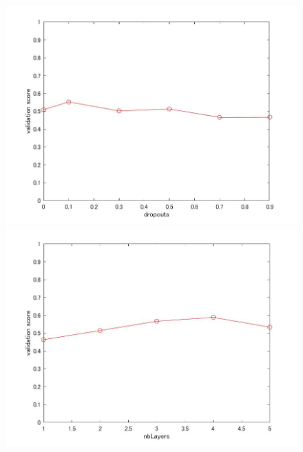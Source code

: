 \documentclass[a4j,11pt]{jarticle}
\begin{document}
\begin{figure}
\begin{minipage}{0.50\hsize}
\begin{center}
			\includegraphics[width=12cm, bb=0 0 875 656]{../matlab/fig/dropouts.jpg}
		\end{center}
	\end{minipage}
	\begin{minipage}{0.50\hsize}
		\begin{center}
			\includegraphics[width=12cm, bb=0 0 875 656]{../matlab/fig/nbLayers.jpg}
		\end{center}
	\end{minipage}
\end{figure}
\end{document}

